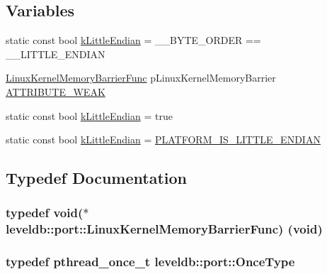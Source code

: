 \subsection*{Variables}
\begin{DoxyCompactItemize}
\item 
static const bool \hyperlink{namespaceleveldb_1_1port_a1d2c52a3c3be0edb6562c9494b85bfec}{k\+Little\+Endian} = \+\_\+\+\_\+\+B\+Y\+T\+E\+\_\+\+O\+R\+D\+E\+R == \+\_\+\+\_\+\+L\+I\+T\+T\+L\+E\+\_\+\+E\+N\+D\+I\+A\+N
\item 
\hyperlink{namespaceleveldb_1_1port_a26aaa60a9935f76f68c0f6cd2cd842c3}{Linux\+Kernel\+Memory\+Barrier\+Func} p\+Linux\+Kernel\+Memory\+Barrier \hyperlink{namespaceleveldb_1_1port_a394c0a7d4f324a2f6c4f0a360257080e}{A\+T\+T\+R\+I\+B\+U\+T\+E\+\_\+\+W\+E\+A\+K}
\item 
static const bool \hyperlink{namespaceleveldb_1_1port_a1d2c52a3c3be0edb6562c9494b85bfec}{k\+Little\+Endian} = true
\item 
static const bool \hyperlink{namespaceleveldb_1_1port_a1d2c52a3c3be0edb6562c9494b85bfec}{k\+Little\+Endian} = \hyperlink{port__posix_8h_a70cdc2961c4e178e613d23a851e57f5d}{P\+L\+A\+T\+F\+O\+R\+M\+\_\+\+I\+S\+\_\+\+L\+I\+T\+T\+L\+E\+\_\+\+E\+N\+D\+I\+A\+N}
\end{DoxyCompactItemize}


\subsection{Typedef Documentation}
\hypertarget{namespaceleveldb_1_1port_a26aaa60a9935f76f68c0f6cd2cd842c3}{}
\subsubsection[{Linux\+Kernel\+Memory\+Barrier\+Func}]{\setlength{\rightskip}{0pt plus 5cm}typedef void($\ast$ leveldb\+::port\+::\+Linux\+Kernel\+Memory\+Barrier\+Func) (void)}\label{namespaceleveldb_1_1port_a26aaa60a9935f76f68c0f6cd2cd842c3}
\hypertarget{namespaceleveldb_1_1port_a80651a8fb458d9b7b3c1f492f9abd055}{}
\subsubsection[{Once\+Type}]{\setlength{\rightskip}{0pt plus 5cm}typedef pthread\+\_\+once\+\_\+t {\bf leveldb\+::port\+::\+Once\+Type}}\label{namespaceleveldb_1_1port_a80651a8fb458d9b7b3c1f492f9abd055}
\hypertarget{namespaceleveldb_1_1port_a3017c82209c2da44f142ef633e012149}{}
